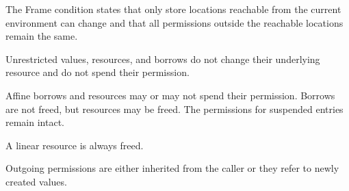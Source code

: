 The Frame condition states that only store locations reachable from
the current environment can change and that all permissions outside
the reachable locations remain the same.

Unrestricted values, resources, and borrows do not change their
underlying resource and do not spend their permission.

Affine borrows and resources may or may not spend their
permission. Borrows are not freed, but resources may be freed. The
permissions for suspended entries remain intact.


A linear resource is always freed.

Outgoing permissions are either inherited from the caller or they
refer to newly created values.


